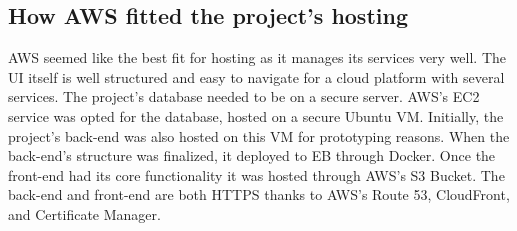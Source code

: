\subsection{How AWS fitted the project's hosting}
AWS seemed like the best fit for hosting as it manages its services very well. The UI itself is well structured and easy to navigate for a cloud platform with several services. The project's database needed to be on a secure server. AWS's EC2 service was opted for the database, hosted on a secure Ubuntu VM. Initially, the project's back-end was also hosted on this VM for prototyping reasons. When the back-end's structure was finalized, it deployed to EB through Docker. Once the front-end had its core functionality it was hosted through AWS's S3 Bucket. The back-end and front-end are both HTTPS thanks to AWS's Route 53, CloudFront, and Certificate Manager.


